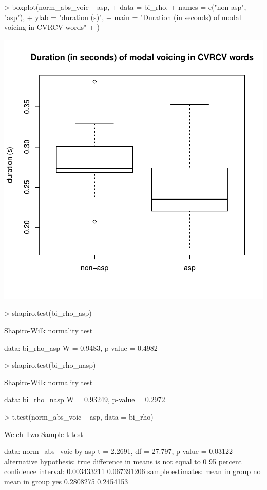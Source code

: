 \documentclass[a4paper,11pt]{article}
\begin{document}
\begin{Schunk}
\begin{Sinput}
> boxplot(norm_abs_voic ~ asp,
+         data = bi_rho,
+         names = c("non-asp", "asp"),
+         ylab = "duration (s)",
+         main = "Duration (in seconds) of modal voicing in CVRCV words"
+         )
\end{Sinput}
\end{Schunk}
\includegraphics{analysis-033}

\begin{Schunk}
\begin{Sinput}
> shapiro.test(bi_rho_asp)
\end{Sinput}
\begin{Soutput}
	Shapiro-Wilk normality test

data:  bi_rho_asp
W = 0.9483, p-value = 0.4982
\end{Soutput}
\begin{Sinput}
> shapiro.test(bi_rho_nasp)
\end{Sinput}
\begin{Soutput}
	Shapiro-Wilk normality test

data:  bi_rho_nasp
W = 0.93249, p-value = 0.2972
\end{Soutput}
\begin{Sinput}
> t.test(norm_abs_voic ~ asp, data = bi_rho)
\end{Sinput}
\begin{Soutput}
	Welch Two Sample t-test

data:  norm_abs_voic by asp
t = 2.2691, df = 27.797, p-value = 0.03122
alternative hypothesis: true difference in means is not equal to 0
95 percent confidence interval:
 0.003433211 0.067391206
sample estimates:
 mean in group no mean in group yes 
        0.2808275         0.2454153 
\end{Soutput}
\end{Schunk}
\end{document}
